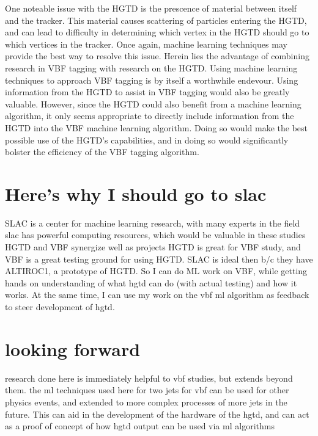 \documentclass[paper=a4,fontsize=12pt]{article}
\begin{document}
    One noteable issue with the HGTD is the prescence of material between itself and the tracker. This material causes scattering of particles entering the HGTD, and can lead to difficulty in determining which vertex in the HGTD should go to which vertices in the tracker. Once again, machine learning techniques may provide the best way to resolve this issue. Herein lies the advantage of combining research in VBF tagging with research on the HGTD. Using machine learning techniques to approach VBF tagging is by itself a worthwhile endevour. Using information from the HGTD to assist in VBF tagging would also be greatly valuable. However, since the HGTD could also benefit from a machine learning algorithm, it only seems appropriate to directly include information from the HGTD into the VBF machine learning algorithm. Doing so would make the best possible use of the HGTD's capabilities, and in doing so would significantly bolster the efficiency of the VBF tagging algorithm.


    
    
\section*{Here's why I should go to slac}
    SLAC is a center for machine learning research, with many experts in the field
    slac has powerful computing resources, which would be valuable in these studies
    HGTD and VBF synergize well as projects
    HGTD is great for VBF study, and VBF is a great testing ground for using HGTD.
    SLAC is ideal then b/c they have ALTIROC1, a prototype of HGTD.
    So I can do ML work on VBF, while getting hands on understanding of what hgtd can do (with actual testing) and how it works.
    At the same time, I can use my work on the vbf ml algorithm as feedback to steer development of hgtd.


\section*{looking forward}
    research done here is immediately helpful to vbf studies, but extends beyond them. 
    the ml techniques used here for two jets for vbf can be used for other physics events,
    and extended to more complex processes of more jets in the future.
    This can aid in the development of the hardware of the hgtd,
    and can act as a proof of concept of how hgtd output can be used via ml algorithms

    
\end{document}

